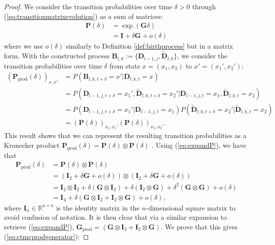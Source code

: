 \begin{proof}
    We consider the transition probabilities over time $\delta > 0$ through (\ref{eq:transitionmatrixevolution}) as a sum of matrices:
    \begin{align}
        \mathbf{P}(\delta) &= \exp(\mathbf{G}\delta) \\
        &= \mathbf{I} + \delta \mathbf{G} + o(\delta) \label{eq:expandP}
    \end{align}
    where we use $o(\delta)$ similarly to Definition \ref{def:birthprocess} but in a matrix form. With the constructed process $\mathbf{B}_{l, k}:= \{\mathbf{D}_{l-1, j}, \tilde{\mathbf{D}}_{l, k}\}$, we consider the transition probabilities over time $\delta$ from state $x = (x_1, x_2)$ to $x' = (x_1', x_2')$:
    \begin{align}
        (\mathbf{P}_{\text{prod}}(\delta))_{x, x'} &= P(\mathbf{B}_{l, k, t + \delta} = x' | \mathbf{D}_{l, k, t} = x) \\
        &= P(\mathbf{D}_{l-1, j, t+\delta} = x_1', \tilde{\mathbf{D}}_{l, k, t+\delta} = x_2' | \mathbf{D}_{l-1, j, t} = x_1, \tilde{\mathbf{D}}_{l, k, t} = x_2) \\
        &= P(\mathbf{D}_{l-1, j, t+\delta} = x_1' | \mathbf{D}_{l-1, j, t} = x_1)P(\tilde{\mathbf{D}}_{l, k, t+\delta} = x_2' | \tilde{\mathbf{D}}_{l, k, t} = x_2) \\
        &= (\mathbf{P}(\delta))_{x_1, x_1'}(\mathbf{P}(\delta))_{x_2, x_2'}.
    \end{align}
    This result shows that we can represent the resulting transition probabilities as a Kronecker product $\mathbf{P}_{\text{prod}}(\delta) = \mathbf{P}(\delta) \otimes \mathbf{P}(\delta)$ \cite{Kronecker}. Using (\ref{eq:expandP}), we have that
    \begin{align}
        \mathbf{P}_{\text{prod}}(\delta) &= \mathbf{P}(\delta) \otimes \mathbf{P}(\delta) \\
        &= (\mathbf{I}_2  + \delta \mathbf{G} + o(\delta)) \otimes (\mathbf{I}_2 + \delta \mathbf{G} + o(\delta)) \\
        &= \mathbf{I}_2  \otimes \mathbf{I}_2  + \delta(\mathbf{G} \otimes \mathbf{I}_2 ) + \delta(\mathbf{I}_2  \otimes \mathbf{G}) + \delta^2(\mathbf{G} \otimes \mathbf{G}) + o(\delta) \\
        &=  \mathbf{I}_4 + \delta  (\mathbf{G} \otimes \mathbf{I}_2  + \mathbf{I}_2  \otimes \mathbf{G})+ o(\delta),
    \end{align}
    where $\mathbf{I}_n \in \mathbb{R}^{n \times n}$ is the identity matrix in the $n$-dimensional square matrix to avoid confusion of notation. It is then clear that via a similar expansion to retrieve (\ref{eq:expandP}), $\mathbf{G}_{\text{prod}} = (\mathbf{G} \otimes \mathbf{I}_2  + \mathbf{I}_2  \otimes \mathbf{G})$. We prove that this gives (\ref{eq:ctmcprodgenerator}):

\end{proof}
